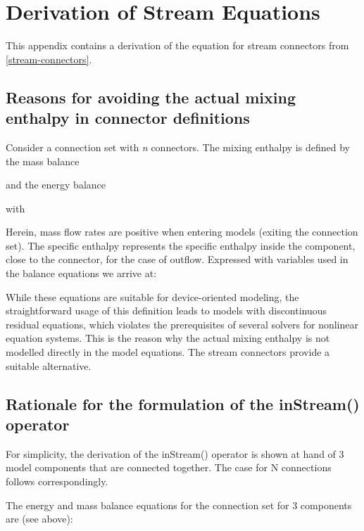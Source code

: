 \documentclass[10pt,a4paper]{report}
\def\doublelabel#1{\label{#1}\hypertarget{#1}{}}
\begin{document}
\chapter{Derivation of Stream Equations}\doublelabel{derivation-of-stream-equations}

This appendix contains a derivation of the equation for stream
connectors from \ref{stream-connectors}.

\section{Reasons for avoiding the actual mixing enthalpy in connector definitions}\doublelabel{reasons-for-avoiding-the-actual-mixing-enthalpy-in-connector-definitions}

Consider a connection set with \emph{n} connectors. The mixing enthalpy
is defined by the mass balance

and the energy balance

with

Herein, mass flow rates are positive when entering models (exiting the
connection set). The specific enthalpy represents the specific enthalpy
inside the component, close to the connector, for the case of outflow.
Expressed with variables used in the balance equations we arrive at:

While these equations are suitable for device-oriented modeling, the
straightforward usage of this definition leads to models with
discontinuous residual equations, which violates the prerequisites of
several solvers for nonlinear equation systems. This is the reason why
the actual mixing enthalpy is not modelled directly in the model
equations. The stream connectors provide a suitable alternative.


\section{Rationale for the formulation of the inStream() operator}\doublelabel{rationale-for-the-formulation-of-the-instream-operator}

For simplicity, the derivation of the inStream() operator is shown at
hand of 3 model components that are connected together. The case for N
connections follows correspondingly.

The energy and mass balance equations for the connection set for 3
components are (see above):
\end{document}
